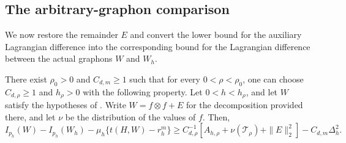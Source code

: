 \subsection{The arbitrary-graphon comparison}
\label{sec:graphon-comparison}

We now restore the remainder $E$ and convert the lower bound for the auxiliary
Lagrangian difference into the corresponding bound for the Lagrangian
difference between the actual graphons $W$ and $W_h$.

\begin{lemma}
\label{lem:graphon-lagrangian-bound}
There exist $\rho_0>0$ and $C_{d,m}\ge1$ such that for
every $0<\rho<\rho_0$, one can choose $C_{d,\rho}\ge1$ and $h_\rho>0$ with
the following property.  Let $0<h<h_\rho$, and let $W$ satisfy the hypotheses of
.  Write $W=f\otimes f+E$ for the
decomposition provided there, and let $\nu$ be the distribution of the
values of $f$.  Then,
\begin{equation}\label{eq:graphon-lagrangian-bound}
  I_{p_h}(W)-I_{p_h}(W_h)-\mu_h\{t(H,W)-r_h^m\}
  \ge C_{d,\rho}^{-1}\!\left[A_{h,\rho}+\nu(\mathcal T_\rho)+\|E\|_2^2\right]
  -C_{d,m}\Delta_h^2.
\end{equation}
\end{lemma}

